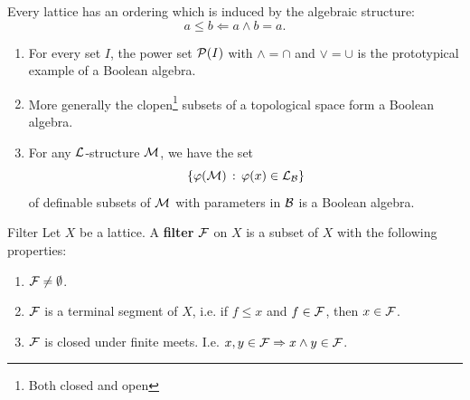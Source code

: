 \documentclass{article}
\numberwithin{thm}{subsection}
\begin{document}
Every lattice has an ordering which is induced by the algebraic structure: \[ a\leq b \Leftarrow a \wedge b = a. \]
\begin{exs}\hspace{0.1cm}
    \begin{enumerate}
        \item For every set $I$, the power set $\mathcal{P}(I)$ with $\wedge = \cap$ and $\vee = \cup$ is the prototypical example of a Boolean algebra.
        \item More generally the clopen\footnote{Both closed and open} subsets of a topological space form a Boolean algebra.
        \item For any $\mathcal{L}$-structure $\mathcal{M}$, we have the set \[ \{ \varphi(\mathcal{M}) \, : \, \varphi(x) \in \mathcal{L}_{\mathcal{B}} \} \] of definable subsets of $\mathcal{M}$ with parameters in $\mathcal{B}$ is a Boolean algebra.
    \end{enumerate}
\end{exs}
\begin{fancydefine}{Filter}
    Let $X$ be a lattice. A \textbf{filter} $\mathcal{F}$ on $X$ is a subset of $X$ with the following properties: \begin{enumerate}
        \item $\mathcal{F} \neq \emptyset$.
        \item $\mathcal{F}$ is a terminal segment of $X$, i.e. if $f \leq x$ and $f \in \mathcal{F}$, then $x \in \mathcal{F}$.
        \item $\mathcal{F}$ is closed under finite meets. I.e. $x,y \in \mathcal{F} \Rightarrow x \wedge y \in \mathcal{F}$.
    \end{enumerate}
\end{fancydefine}
\end{document}
